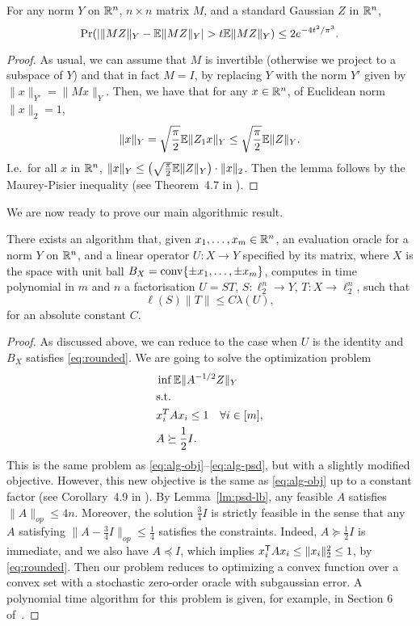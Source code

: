 \begin{lemma}\label{lm:concentr}
  For any norm $Y$ on ${\mathbb{R}}^n$, $n\times n$ matrix $M$, and a
  standard Gaussian $Z$ in ${\mathbb{R}}^n$,
  \[
  \Pr(|\|MZ\|_Y - \mathbb{E} \|MZ\|_Y| > t \mathbb{E} \|MZ\|_Y) \le 2e^{-4t^2/\pi^3}.
  \]
\end{lemma}
\begin{proof}
  As  usual, we can assume that $M$ is invertible (otherwise we
  project to a subspace of $Y$) and that in fact $M = I$, by replacing
  $Y$ with the norm $Y'$ given by $\|x\|_{Y'} = \|Mx\|_Y$. Then, we
  have that for any $x \in {\mathbb{R}}^n$, of Euclidean norm $\|x\|_2 = 1$,
  \[
  \|x\|_Y = \sqrt{\frac{\pi}{2}}\mathbb{E}\|Z_1 x\|_Y 
  \le \sqrt{\frac{\pi}{2}} \mathbb{E}\|Z\|_Y.
  \]
  I.e.~for all $x$ in ${\mathbb{R}}^n$, $\|x\|_Y \le
  \left(\sqrt{\frac{\pi}{2}}\mathbb{E}\|Z\|_Y\right)\cdot \|x\|_2$. Then the lemma follows by
  the Maurey-Pisier inequality (see Theorem~4.7 in \cite{Pisier-book}).
\end{proof}

We are now ready to prove our main algorithmic result. 
\begin{theorem}\label{thm:alg}
  There exists an algorithm that, given $x_1, \ldots, x_m \in {\mathbb{R}}^n$,
  an evaluation oracle for a norm $Y$ on ${\mathbb{R}}^n$, and
  a linear operator $U:X \to Y$ specified by its matrix, where $X$ is
  the space with unit ball $B_X = \operatorname{conv}\{\pm x_1, \ldots, \pm x_m\}$,
  computes in time polynomial in $m$ and $n$ a factorisation $U = ST$,
  $S:\ell_2^n \to Y$, $T:X \to \ell_2^n$,  such that 
  \[
  \ell(S) \|T\| \le C\lambda(U),
  \]
  for an absolute constant $C$.
\end{theorem}
\begin{proof}
  As discussed above, we can reduce to the case when $U$ is the
  identity and $B_X$ satisfies \eqref{eq:rounded}. We are going to
  solve the optimization problem
  \begin{align*}
    &\inf  \mathbb{E}\|A^{-1/2} Z\|_Y\\
    &\text{s.t.}\notag\\
    &x_i^T A x_i \le 1 \ \ \ \forall i \in [m],\\
    &A \succeq \frac12 I.
  \end{align*}
  This is the same problem as \eqref{eq:alg-obj}--\eqref{eq:alg-psd},
  but with a slightly modified objective. However, this new objective
  is the same as \eqref{eq:alg-obj} up to a constant factor (see
  Corollary~4.9 in \cite{Pisier-book}). By Lemma~\ref{lm:psd-lb}, any
  feasible $A$ satisfies $\|A\|_{op} \le 4n$. Moreover, the solution
  $\frac34 I$ is strictly feasible in the sense that any $A$
  satisfying $\|A - \frac34 I\|_{op} \le \frac14$ satisfies the
  constraints. Indeed, $A \succeq \frac12 I$ is immediate, and we also
  have $A \preceq I$, which implies $x_i^\mathsf T A x_i  \le \|x_i\|_2^2 \le
  1$, by \eqref{eq:rounded}. Then our problem reduces to optimizing a
  convex function over a convex set with a stochastic zero-order
  oracle with subgaussian error. A polynomial time algorithm for this
  problem is given, for example, in Section 6 of~\cite{BelloniLNR15}.
\end{proof}

